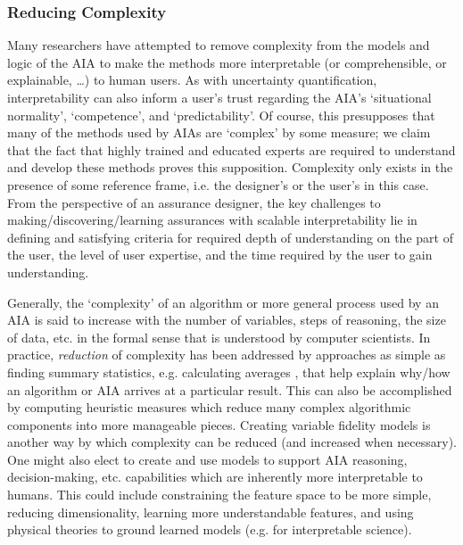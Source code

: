 \subsubsection{Reducing Complexity}
    Many researchers have attempted to remove complexity from the models and logic of the AIA to make the methods more interpretable (or comprehensible, or explainable, \ldots) to human users. As with uncertainty quantification, interpretability can also inform a user's trust regarding the AIA's `situational normality', `competence', and `predictability'. Of course, this presupposes that many of the methods used by AIAs are `complex' by some measure; we claim that the fact that highly trained and educated experts are required to understand and develop these methods %
    proves this supposition. Complexity only exists in the presence of some reference frame, i.e. the designer's or the user's in this case. 
    From the perspective of an assurance designer, the key challenges to making/discovering/learning assurances with scalable interpretability lie in defining and satisfying criteria for required depth of understanding on the part of the user, the level of user expertise, and the time required by the user to gain understanding. 

    Generally, the `complexity' of an algorithm or more general process used by an AIA is said to increase with the number of variables, steps of reasoning, the size of data, etc. in the formal sense that is understood by computer scientists. 
    In practice, \textit{reduction} of complexity has been addressed by approaches as simple as finding summary statistics, e.g. calculating averages \cite{Muir1994-ow,Muir1996-gt}, that help explain why/how an algorithm or AIA arrives at a particular result. 
    This can also be accomplished by computing heuristic measures which reduce many complex algorithmic components into more manageable pieces\cite{Aitken2016-cv}. Creating variable fidelity models is another way by which complexity can be reduced (and increased when necessary). One might also elect to create and use models to support AIA reasoning, decision-making, etc. capabilities which are inherently more interpretable to humans. This could include constraining the feature space to be more simple, reducing dimensionality, learning more understandable features, and using physical theories to ground learned models (e.g. for interpretable science).  %
        
